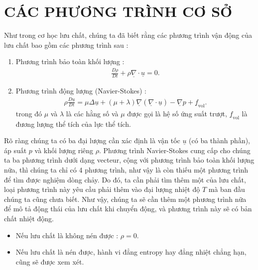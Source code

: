\documentclass[DONG_HOC_KHI_QUYEN.tex]{subfiles}
\begin{document}
\chapter{CÁC PHƯƠNG TRÌNH CƠ SỞ}
Như trong cơ học lưu chất, chúng ta đã biết rằng các phương trình vận động của lưu chất bao gồm các phương trình sau :
\begin{enumerate}
    \item Phương trình bảo toàn khối lượng :
    \begin{equation}
        \begin{aligned}
            \frac{D\rho}{Dt}+\rho\underline{\nabla}\cdot\underline{u}=0.
        \end{aligned}
    \end{equation}
    \item Phương trình động lượng (Navier-Stokes) :
    \begin{equation}
        \begin{aligned}
            \rho\frac{D\underline{u}}{Dt}=\mu\Delta\underline{u}+\left(\mu+\lambda\right)\underline{\nabla}\left(\underline{\nabla}\cdot\underline{u}\right)-\underline{\nabla}p+\underline{f}_{\text{vol}}.
        \end{aligned}
    \end{equation}
    trong đó $\mu$ và $\lambda$ là các hằng số và $\mu$ được gọi là hệ số ứng suất trượt, $\underline{f}_{\text{vol}}$ là đương lượng thể tích của lực thể tích.
\end{enumerate}

Rõ ràng chúng ta có ba đại lượng cần xác định là vận tốc $\underline{u}$ (có ba thành phần), áp suất $p$ và khối lượng riêng $\rho$. Phương trình Navier-Stokes cung cấp cho chúng ta ba phương trình dưới dạng vecteur, cộng với phương trình bảo toàn khối lượng nữa, thì chúng ta chỉ có 4 phương trình, như vậy là còn thiếu một phương trình để tìm được nghiệm dòng chảy. Do đó, ta cần phải tìm thêm một  của lưu chất, loại phương trình này yêu cầu phải thêm vào đại lượng nhiệt độ $T$ mà ban đầu chúng ta cũng chưa biết. Như vậy, chúng ta sẽ cần thêm một phương trình nữa để mô tả động thái của lưu chất khi chuyển động, và phương trình này sẽ có bản chất nhiệt động.
\begin{itemize}
    \item Nếu lưu chất là không nén được : $\rho=0$.
    \item Nếu lưu chất là nén được, hành vi đẳng entropy hay đẳng nhiệt chẳng hạn, cũng sẽ được xem xét.
\end{itemize}
\end{document}
